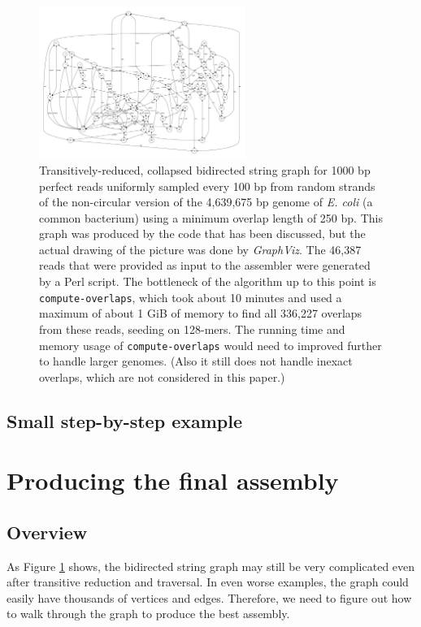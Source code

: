 \documentclass[10pt]{article}
\newcommand{\Figure}[1]{Figure \ref{#1}}
\newcommand{\ProgramName}[1]{{\tt #1}}
\begin{document}
\begin{figure}
	\begin{center}
		\includegraphics[width=0.6\textwidth]{E_coli.pdf}
		\caption{Transitively-reduced, collapsed bidirected string graph for
		1000 bp perfect reads uniformly sampled every 100 bp from random strands
		of the non-circular version of the 4,639,675 bp genome of {\it E. coli}
		(a common bacterium) using a minimum overlap length of 250 bp.  This
		graph was produced by the code that has been discussed, but the actual
		drawing of the picture was done by {\it GraphViz}.  The 46,387 reads
		that were provided as input to the assembler were generated by a Perl
		script.  The bottleneck of the algorithm up to this point is
		\ProgramName{compute-overlaps}, which took about 10 minutes and used a
		maximum of about 1 GiB of memory to find all 336,227 overlaps from these
		reads, seeding on 128-mers.  The running time and memory usage of
		\ProgramName{compute-overlaps} would need to improved further to handle
		larger genomes.  (Also it still does not handle inexact overlaps, which
		are not considered in this paper.)}
		\label{fig:E_coli}
	\end{center}
\end{figure}

\subsection{Small step-by-step example}

\section{Producing the final assembly}
\subsection{Overview}

As \Figure{fig:E_coli} shows, the bidirected string graph may still be very
complicated even after transitive reduction and traversal.  In even worse
examples, the graph could easily have thousands of vertices and edges.
Therefore, we need to figure out how to walk through the graph to produce the
best assembly.
\end{document}

